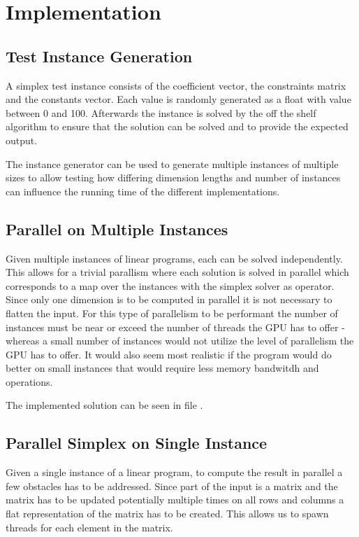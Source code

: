 \section{Implementation}
\subsection{Test Instance Generation}
A simplex test instance consists of the coefficient vector, the constraints matrix and the constants vector. Each value is randomly generated as a float with value between 0 and 100. Afterwards the instance is solved by the off the shelf algorithm to ensure that the solution can be solved and to provide the expected output. 

The instance generator can be used to generate multiple instances of multiple sizes to allow testing how differing dimension lengths and number of instances can influence the running time of the different implementations.


\subsection{Parallel on Multiple Instances}
Given multiple instances of linear programs, each can be solved independently. This allows for a trivial parallism where each solution is solved in parallel which corresponds to a map over the instances with the simplex solver as operator. Since only one dimension is to be computed in parallel it is not necessary to flatten the input. For this type of parallelism to be performant the number of instances must be near or exceed the number of threads the GPU has to offer - whereas a small number of instances would not utilize the level of parallelism the GPU has to offer. It would also seem most realistic if the program would do better on small instances that would require less memory bandwitdh and operations.

The implemented solution can be seen in file .

\subsection{Parallel Simplex on Single Instance}
Given a single instance of a linear program, to compute the result in parallel a few obstacles has to be addressed. Since part of the input is a matrix and the matrix has to be updated potentially multiple times on all rows and columns a flat representation of the matrix has to be created. This allows us to spawn threads for each element in the matrix. 

